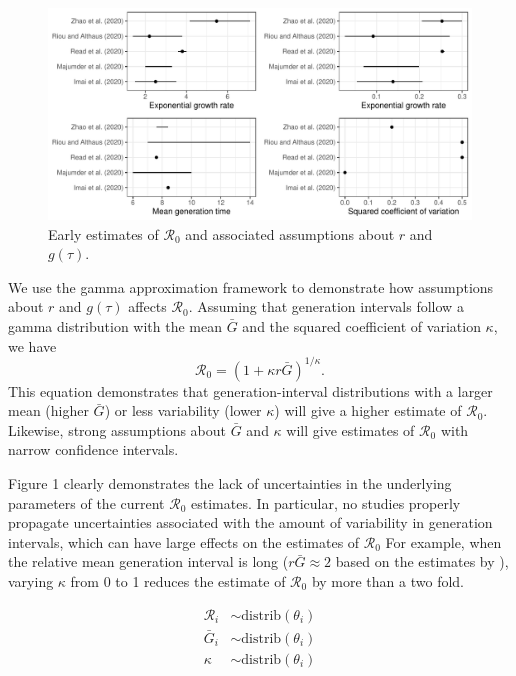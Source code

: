 \documentclass[12pt]{article}
\begin{document}
\begin{figure}[t]
\includegraphics[width=\textwidth]{comparison.pdf}
\caption{
Early estimates of $\mathcal R_0$ and associated assumptions about $r$ and $g(\tau)$.
}
\end{figure}

We use the gamma approximation framework to demonstrate
how assumptions about $r$ and $g(\tau)$
affects $\mathcal R_0$.
Assuming that generation intervals follow a gamma distribution 
with the mean $\bar G$ and the squared coefficient of variation $\kappa$, 
we have
\begin{equation}
\mathcal R_0 = \left(1 + \kappa r \bar{G}\right)^{1/\kappa}.
\end{equation}
This equation demonstrates that generation-interval distributions
with a larger mean (higher $\bar{G}$) or less variability (lower $\kappa$)
will give a higher estimate of $\mathcal R_0$.
Likewise, strong assumptions about $\bar{G}$ and $\kappa$ will give
estimates of $\mathcal R_0$ with narrow confidence intervals.

Figure 1 clearly demonstrates the lack of uncertainties in the underlying parameters
of the current $\mathcal R_0$ estimates.
In particular, no studies properly propagate uncertainties associated with the
amount of variability in generation intervals, which can have 
large effects on the estimates of $\mathcal R_0$
For example, when the relative mean generation interval is long ($r\bar{G}\approx 2$ based on the estimates by \cite{zhaoncov}),
varying $\kappa$ from 0 to 1 reduces the estimate of $\mathcal R_0$ by more than a two fold.

\begin{equation}
\begin{aligned}
\mathcal R_i &\sim \textrm{distrib}(\theta_i)\\
\bar G_i &\sim \textrm{distrib}(\theta_i)\\
\kappa &\sim \textrm{distrib}(\theta_i)\\
\end{aligned}
\end{equation}


\end{document}
